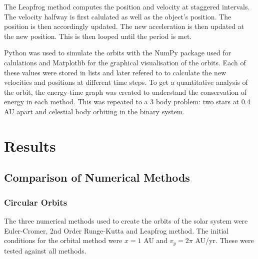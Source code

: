 \documentclass[11 pt, a4paper]{article}
\begin{document}
The Leapfrog method computes the position and velocity at staggered intervals. The velocity halfway is first calulated as well as the object's position. The position is then accordingly updated. The new acceleration
is then updated at the new position. This is then looped until the period is met.

Python was used to simulate the orbits with the NumPy package used for calulations and Matplotlib for the graphical visualisation of the orbits. Each of these values were stored in lists and later refered to to calculate
the new velocities and positions at different time steps. To get a quantitative analysis of the orbit, the energy-time graph was created to understand the conservation of energy in each method. This was repeated
to a 3 body problem: two stars at 0.4 AU apart and celestial body orbiting in the binary system.

\section{Results}
\subsection{Comparison of Numerical Methods}
\subsubsection{Circular Orbits}
The three numerical methods used to create the orbits of the solar system were Euler-Cromer, 2nd Order Runge-Kutta and Leapfrog method.
The initial conditions for the orbital method were $x = 1$ AU and $v_y=2\pi$ AU/yr. These were tested against all methods.
\end{document}
